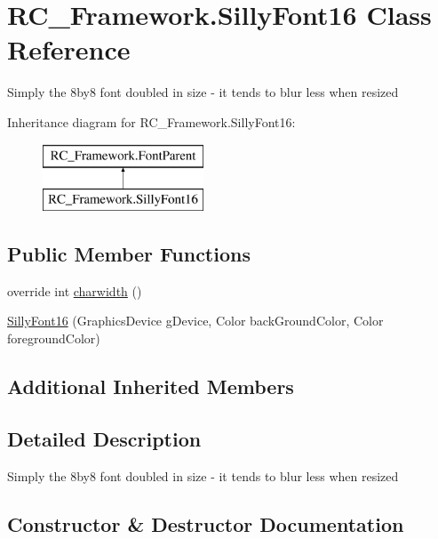 \hypertarget{class_r_c___framework_1_1_silly_font16}{}\section{R\+C\+\_\+\+Framework.\+Silly\+Font16 Class Reference}
\label{class_r_c___framework_1_1_silly_font16}


Simply the 8by8 font doubled in size -\/ it tends to blur less when resized  


Inheritance diagram for R\+C\+\_\+\+Framework.\+Silly\+Font16\+:\begin{figure}[H]
\begin{center}
\leavevmode
\includegraphics[height=2.000000cm]{class_r_c___framework_1_1_silly_font16}
\end{center}
\end{figure}
\subsection*{Public Member Functions}
\begin{DoxyCompactItemize}
\item 
override int \mbox{\hyperlink{class_r_c___framework_1_1_silly_font16_aa718495839a1492ebf5d7245d7d4620a}{charwidth}} ()
\item 
\mbox{\hyperlink{class_r_c___framework_1_1_silly_font16_aac4f3796b62deae3675e85c90b44363d}{Silly\+Font16}} (Graphics\+Device g\+Device, Color back\+Ground\+Color, Color foreground\+Color)
\end{DoxyCompactItemize}
\subsection*{Additional Inherited Members}


\subsection{Detailed Description}
Simply the 8by8 font doubled in size -\/ it tends to blur less when resized 



\subsection{Constructor \& Destructor Documentation}
\mbox{\label{class_r_c___framework_1_1_silly_font16_aac4f3796b62deae3675e85c90b44363d}} 
